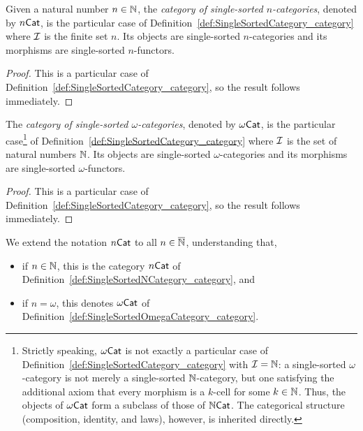 \begin{construction}
  \label{def:SingleSortedNCategory_category}
  \leanok
  Given a natural number $n \in \mathbb{N}$, the \emph{category of single-sorted $n$-categories}, denoted
  by $n\mathsf{Cat}$, is the particular case of Definition~\ref{def:SingleSortedCategory_category} where
  $\mathcal{I}$ is the finite set $n$. Its objects are single-sorted $n$-categories and its morphisms are
  single-sorted $n$-functors.
\end{construction}

\begin{proof}
  \leanok
  This is a particular case of Definition~\ref{def:SingleSortedCategory_category}, so the result
  follows immediately.
\end{proof}

\begin{construction}
  \label{def:SingleSortedOmegaCategory_category}
  \leanok
  The \emph{category of single-sorted $\omega$-categories}, denoted by $\omega\mathsf{Cat}$, is the
  particular case\footnote{Strictly speaking, $\omega\mathsf{Cat}$ is not exactly a particular case of
  Definition~\ref{def:SingleSortedCategory_category} with $\mathcal{I} = \mathbb{N}$: a single-sorted
  $\omega$-category is not merely a single-sorted $\mathbb{N}$-category, but one satisfying the additional
  axiom that every morphism is a $k$-cell for some $k \in \mathbb{N}$. Thus, the objects of $\omega\mathsf{Cat}$
  form a subclass of those of $\mathbb{N}\mathsf{Cat}$. The categorical structure (composition, identity, and
  laws), however, is inherited directly.} of Definition~\ref{def:SingleSortedCategory_category}
  where $\mathcal{I}$ is the set of natural numbers $\mathbb{N}$. Its objects are single-sorted
  $\omega$-categories and its morphisms are single-sorted $\omega$-functors.
\end{construction}

\begin{proof}
  \leanok
  This is a particular case of Definition~\ref{def:SingleSortedCategory_category}, so the result
  follows immediately.
\end{proof}

\begin{notation}
  We extend the notation $n\mathsf{Cat}$ to all $n \in \overline{\mathbb{N}}$, understanding that,
  \begin{itemize}
    \item if $n \in \mathbb{N}$, this is the category $n\mathsf{Cat}$ of
      Definition~\ref{def:SingleSortedNCategory_category}, and
    \item if $n = \omega$, this denotes $\omega\mathsf{Cat}$ of
      Definition~\ref{def:SingleSortedOmegaCategory_category}.
  \end{itemize}
\end{notation}
